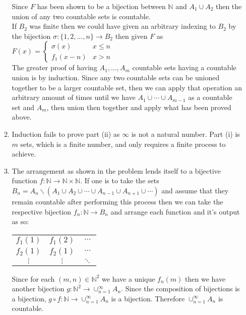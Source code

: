 \documentclass[12pt, letterpaper]{article}
\newcommand{\N}{\mathbb{N}}
\begin{document}
\begin{enumerate}
\begin{enumerate}
\begin{itemize}
		\end{itemize}
		Since $F$ has been shown to be a bijection between $\N$ and $A_1 \cup A_2$ then the union of any two countable sets is countable.\\  If $B_2$ was finite then we could have given an arbitrary indexing to $B_2$ by the bijection $\sigma : \{1,2,\ldots,n\} \to B_2$ then given $F$ as $F(x) = \begin{cases} \sigma(x) & x \leq n\\ f_1(x-n) & x > n \end{cases}$\\
		The greater proof of having $A_1,\ldots,A_m$ countable sets having a countable union is by induction.  Since any two countable sets can be unioned together to be a larger countable set, then we can apply that operation an arbitrary amount of times until we have $A_1 \cup \cdots \cup A_{m-1}$ as a countable set and $A_m$, then union then together and apply what has been proved above. 
		\item Induction fails to prove part (ii) as $\infty$ is not a natural number.  Part (i) is $m$ sets, which is a finite number, and only requires a finite process to achieve. 
		\item The arrangement as shown in the problem lends itself to a bijective function $f: \N \to \N \times \N$.  If one is to take the sets $B_n = A_n \backslash (A_1 \cup A_2 \cup \cdots \cup A_{n-1} \cup A_{n+1} \cup \cdots)$ and assume that they remain countable after performing this process then we can take the respective bijection $f_n : \N \to B_n$ and arrange each function and it's output as so: 
		
		\begin{tabular}{c c c}
		$f_1 (1)$ & $f_1(2)$ & $\cdots$\\
		$f_2 (1)$ & $f_2(1)$ & $\cdots$\\
		$\vdots$ & $\vdots$  & $\ddots$
		\end{tabular}
		Since for each $(m,n) \in \N^2$ we have a unique $f_n (m)$ then we have another bijection $g: \N^2 \to \cup_{n=1}^\infty A_n$.  Since the composition of bijections is a bijection, $g \circ f : \N \to  \cup_{n=1}^\infty A_n$ is a bijection.  Therefore $ \cup_{n=1}^\infty A_n$ is countable.   
		\end{enumerate}
\end{enumerate}
\end{document}
